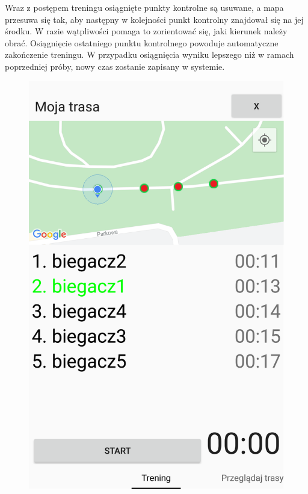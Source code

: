 Wraz z postępem treningu osiągnięte punkty kontrolne są usuwane, a mapa przesuwa się tak, aby następny w kolejności punkt kontrolny znajdował się na jej środku. W razie wątpliwości pomaga to zorientować się, jaki kierunek należy obrać. Osiągnięcie ostatniego punktu kontrolnego powoduje automatyczne zakończenie treningu. W przypadku osiągnięcia wyniku lepszego niż w ramach poprzedniej próby, nowy czas zostanie zapisany w systemie.
\begin{figure}
\centering
\begin{minipage}{.5\textwidth}
  \centering
  \includegraphics[width=.8\linewidth,frame]{img/rywalizacjaw1}
  \label{image:rywalizacjaw1}
\end{minipage}%
\begin{minipage}{.5\textwidth}
  \centering

\end{minipage}
\end{figure}
